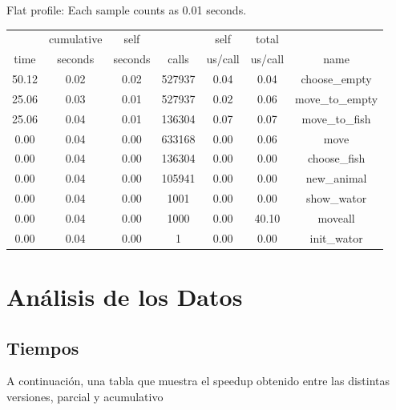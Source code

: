 \documentclass[a4paper,10pt]{article}
\begin{document}
\begin{itemize}
Flat profile:
Each sample counts as 0.01 seconds.
\begin{center}
  \begin{tabular}{| c | c | c | c | c | c | c |}
    \hline
	&   cumulative &   self &   &              self &     total &     \\           
 time 	&   seconds &   seconds &    calls &  us/call &   us/call &   name \\ \hline    
 50.12 &      0.02 &     0.02 &   527937 &     0.04 &      0.04 &   choose\_empty \\ \hline
 25.06 &      0.03 &     0.01 &   527937 &     0.02 &      0.06 &   move\_to\_empty \\ \hline
 25.06 &      0.04 &     0.01 &   136304 &     0.07 &      0.07 &   move\_to\_fish \\ \hline
  0.00 &      0.04 &     0.00 &   633168 &     0.00 &      0.06 &   move \\ \hline
  0.00 &      0.04 &     0.00 &   136304 &     0.00 &      0.00 &   choose\_fish \\ \hline
  0.00 &      0.04 &     0.00 &   105941 &     0.00 &      0.00 &   new\_animal \\ \hline
  0.00 &      0.04 &     0.00 &     1001 &     0.00 &      0.00 &   show\_wator \\ \hline
  0.00 &      0.04 &     0.00 &     1000 &     0.00 &     40.10 &   moveall \\ \hline
  0.00 &      0.04 &     0.00 &        1 &     0.00 &      0.00 &   init\_wator \\ \hline
  
  \end{tabular}
\end{center}
 
\end{itemize}

\newpage

\section{An\'alisis de los Datos}

\subsection{Tiempos}

    A continuaci\'on, una tabla que muestra el speedup obtenido entre las distintas versiones, parcial y acumulativo
\end{document}
